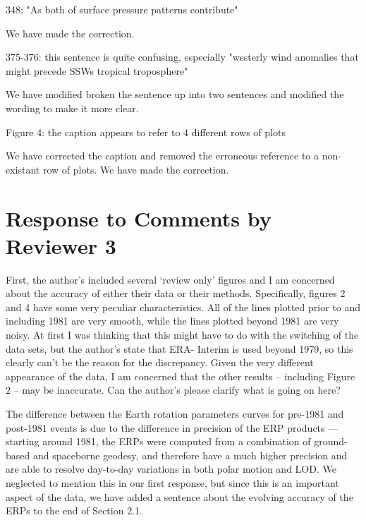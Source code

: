 \documentclass[a4paper,10pt]{article}
\begin{document}
\noindent \textcolor{reviewer}{348: "As both of surface pressure patterns contribute"}
\vspace{0.5cm}

We have made the correction.
\vspace{0.5cm}

\noindent \textcolor{reviewer}{375-376: this sentence is quite confusing, especially "westerly wind anomalies that might precede SSWs tropical troposphere"}
\vspace{0.5cm}

We have modified broken the sentence up into two sentences and modified the wording to make it more clear.
\vspace{0.5cm}

\noindent \textcolor{reviewer}{Figure 4: the caption appears to refer to 4 different rows of plots}
\vspace{0.5cm}

We have corrected the caption and removed the erroneous reference to a non-existant row of plots.
We have made the correction.
\vspace{0.5cm}



\section{Response to Comments by Reviewer 3}
\label{sec:R3}

\textcolor{reviewer}{First, the author’s included several ‘review only’ figures and I am concerned about the
accuracy of either their data or their methods. Specifically, figures 2 and 4 have some
very peculiar characteristics. All of the lines plotted prior to and including 1981 are very
smooth, while the lines plotted beyond 1981 are very noisy. At first I was thinking that
this might have to do with the switching of the data sets, but the author’s state that ERA-
Interim is used beyond 1979, so this clearly can’t be the reason for the discrepancy.
Given the very different appearance of the data, I am concerned that the other results –
including Figure 2 – may be inaccurate. Can the author’s please clarify what is going on
here?}
\vspace{0.5cm}

The difference between the Earth rotation parameters curves  for pre-1981 and post-1981 events is due to the difference in precision of the ERP products --- starting around 1981, the ERPs were computed from a combination of ground- based and spaceborne geodesy, and therefore have a much higher precision and are able to resolve day-to-day variations in both polar motion and LOD.  We neglected to mention this in our first response, but since this is an important aspect of the data, we have added a sentence about the evolving accuracy of the ERPs to the end of Section 2.1. 
\vspace{0.5cm}
\end{document}
